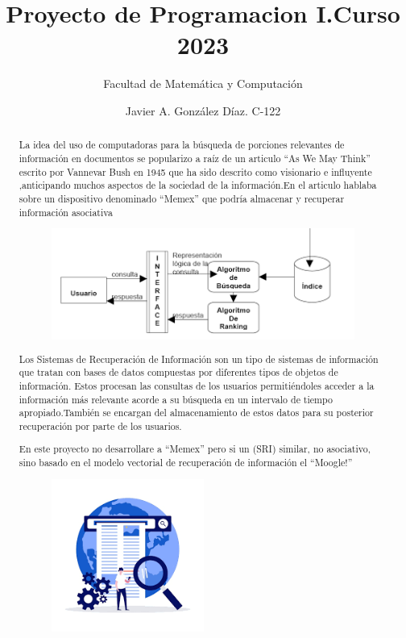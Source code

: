 \documentclass{article}%
\begin{document}
\title{Proyecto de Programacion I.Curso 2023}
\author{Facultad de Matemática y Computación}
\date{Javier A. González Díaz.     C-122}
\maketitle

\begin{abstract}

    La idea del uso de computadoras para la búsqueda de porciones relevantes   
    de información en documentos se popularizo a raíz de un articulo “As We May Think” escrito por Vannevar Bush en 1945 que ha sido descrito como visionario e influyente 
,anticipando muchos aspectos de la sociedad de la información.En el articulo hablaba sobre un dispositivo denominado “Memex” que podría almacenar y recuperar información asociativa

\begin{figure}[h]
    \begin{center}
        \includegraphics*[width=10cm]{images.png}
        
    \end{center}   
\end{figure}
Los Sistemas de Recuperación de Información son un tipo de sistemas de información que tratan con bases de datos compuestas por diferentes tipos de objetos de información.
Estos procesan las consultas de los usuarios permitiéndoles acceder a la información más relevante acorde a su búsqueda en un intervalo de tiempo apropiado.También se encargan del almacenamiento de estos datos para su posterior recuperación por parte de los usuarios.

En este proyecto no desarrollare a “Memex” pero si un (SRI) similar, no asociativo, sino basado en el modelo vectorial de recuperación de información el “Moogle!”
\begin{figure}[h]
\includegraphics*[width=5cm]{descarga (1).png}
    
\end{figure}
\end{abstract}
\end{document}
